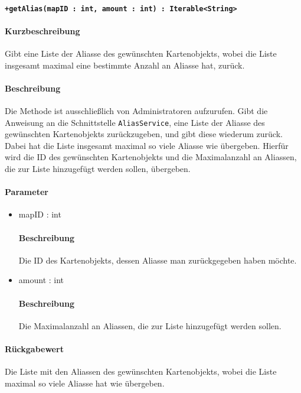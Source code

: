 \paragraph*{\texttt{+getAlias(mapID : int, amount : int) : Iterable<String>}}%
\paragraph*{Kurzbeschreibung}
Gibt eine Liste der Aliasse des gewünschten Kartenobjekts, wobei die Liste insgesamt maximal eine bestimmte Anzahl an Aliasse hat, zurück.
\paragraph*{Beschreibung}
Die Methode ist ausschließlich von Administratoren aufzurufen.
Gibt die Anweisung an die Schnittstelle \texttt{AliasService}, eine Liste der Aliasse des gewünschten Kartenobjekts zurückzugeben, und gibt diese wiederum zurück.
Dabei hat die Liste insgesamt maximal so viele Aliasse wie übergeben.
Hierfür wird die ID des gewünschten Kartenobjekts und die Maximalanzahl an Aliassen, die zur Liste hinzugefügt werden sollen, übergeben.
\paragraph*{Parameter}
\begin{itemize}
    \item mapID : int
    		\paragraph*{Beschreibung}
    		Die ID des Kartenobjekts, dessen Aliasse man zurückgegeben haben möchte.
    	\item amount : int
    		\paragraph*{Beschreibung}
    		Die Maximalanzahl an Aliassen, die zur Liste hinzugefügt werden sollen.
\end{itemize}
\paragraph*{Rückgabewert}
Die Liste mit den Aliassen des gewünschten Kartenobjekts, wobei die Liste maximal so viele Aliasse hat wie übergeben.
